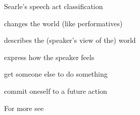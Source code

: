 \documentclass{beamer}
\begin{document}


\begin{frame}{Searle's speech act classification}
  \begin{description}
  \item {} changes the world (like performatives)
  \item {} describes the (speaker's view of the) world 
  \item {}  express how the speaker feels
  \item {} get someone else to do something
  \item {} commit oneself to a future action
  \item For more see  \citet{Searle:1969}
  \end{description}

\end{frame}


 
\end{document}
